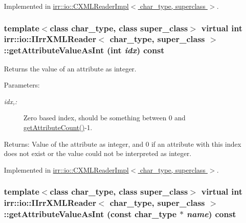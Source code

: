 Implemented in \hyperlink{classirr_1_1io_1_1_c_x_m_l_reader_impl_89fb9f69bba65c76e23d6519bcb5df7d}{irr::io::CXMLReaderImpl$<$ char\_\-type, superclass $>$}.\hypertarget{classirr_1_1io_1_1_i_irr_x_m_l_reader_8f2d57c9f358b9683fb177f440661426}{
\subsubsection[{getAttributeValueAsInt}]{\setlength{\rightskip}{0pt plus 5cm}template$<$class char\_\-type, class super\_\-class$>$ virtual int {\bf irr::io::IIrrXMLReader}$<$ char\_\-type, super\_\-class $>$::getAttributeValueAsInt (int {\em idx}) const}}
\label{classirr_1_1io_1_1_i_irr_x_m_l_reader_8f2d57c9f358b9683fb177f440661426}


Returns the value of an attribute as integer. 

\begin{Desc}
\item[Parameters:]
\begin{description}
\item[{\em idx,:}]Zero based index, should be something between 0 and \hyperlink{classirr_1_1io_1_1_i_irr_x_m_l_reader_eaa1cfc860be7b788f78edec403cc2a2}{getAttributeCount()}-1. \end{description}
\end{Desc}
\begin{Desc}
\item[Returns:]Value of the attribute as integer, and 0 if an attribute with this index does not exist or the value could not be interpreted as integer. \end{Desc}


Implemented in \hyperlink{classirr_1_1io_1_1_c_x_m_l_reader_impl_8c8cf8e6560299e3315cd1a75477bd53}{irr::io::CXMLReaderImpl$<$ char\_\-type, superclass $>$}.\hypertarget{classirr_1_1io_1_1_i_irr_x_m_l_reader_b37bef58865355a7dba0011a38e6c8e7}{
\subsubsection[{getAttributeValueAsInt}]{\setlength{\rightskip}{0pt plus 5cm}template$<$class char\_\-type, class super\_\-class$>$ virtual int {\bf irr::io::IIrrXMLReader}$<$ char\_\-type, super\_\-class $>$::getAttributeValueAsInt (const char\_\-type $\ast$ {\em name}) const}}
\label{classirr_1_1io_1_1_i_irr_x_m_l_reader_b37bef58865355a7dba0011a38e6c8e7}


